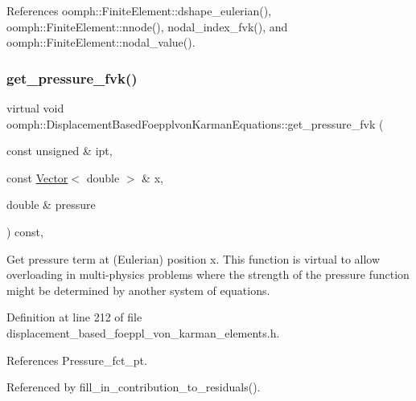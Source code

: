 References oomph\+::\+Finite\+Element\+::dshape\+\_\+eulerian(), oomph\+::\+Finite\+Element\+::nnode(), nodal\+\_\+index\+\_\+fvk(), and oomph\+::\+Finite\+Element\+::nodal\+\_\+value().

\mbox{\label{classoomph_1_1DisplacementBasedFoepplvonKarmanEquations_adf1849b94ae0a98459a02405cde57a1c}} 
\subsubsection{\texorpdfstring{get\+\_\+pressure\+\_\+fvk()}{get\_pressure\_fvk()}}
{\footnotesize\ttfamily virtual void oomph\+::\+Displacement\+Based\+Foepplvon\+Karman\+Equations\+::get\+\_\+pressure\+\_\+fvk (\begin{DoxyParamCaption}\item[{const unsigned \&}]{ipt,  }\item[{const \hyperlink{classoomph_1_1Vector}{Vector}$<$ double $>$ \&}]{x,  }\item[{double \&}]{pressure }\end{DoxyParamCaption}) const\hspace{0.3cm}{\ttfamily [inline]}, {\ttfamily [virtual]}}



Get pressure term at (Eulerian) position x. This function is virtual to allow overloading in multi-\/physics problems where the strength of the pressure function might be determined by another system of equations. 



Definition at line 212 of file displacement\+\_\+based\+\_\+foeppl\+\_\+von\+\_\+karman\+\_\+elements.\+h.



References Pressure\+\_\+fct\+\_\+pt.



Referenced by fill\+\_\+in\+\_\+contribution\+\_\+to\+\_\+residuals().

\mbox{\label{classoomph_1_1DisplacementBasedFoepplvonKarmanEquations_ad1f40f34ceb5c97eed8dbc12cc414044}} 
